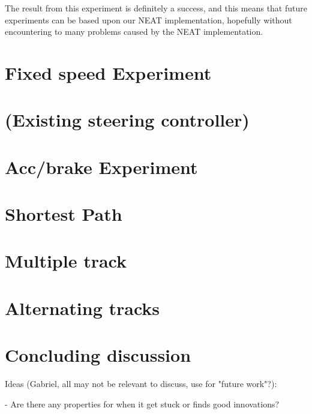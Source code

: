 The result from this experiment is definitely a success, and this means that future experiments can be based upon our NEAT implementation, hopefully without encountering to many problems caused by the NEAT implementation. 


\section{Fixed speed Experiment}

\section{(Existing steering controller)}

\section{Acc/brake Experiment}

\section{Shortest Path}
\section{Multiple track}
\section{Alternating tracks}

\section{Concluding discussion}
%
Ideas (Gabriel, all may not be relevant to discuss, use for "future work"?):

- Are there any properties for when it get stuck or finds good innovations?

